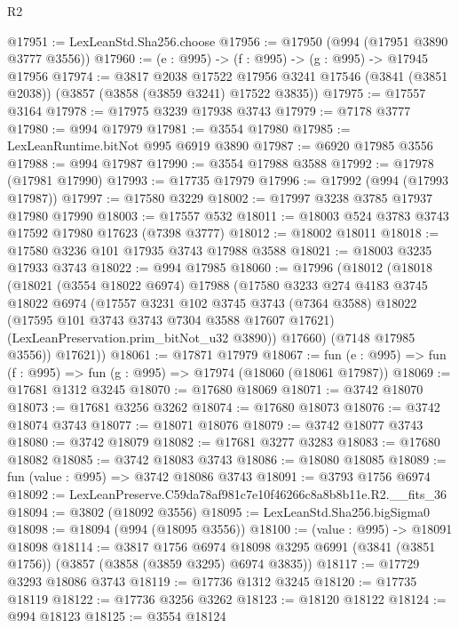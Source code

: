 \begin{lexlean}{R2}
\begin{coremodule}
@17951 := LexLeanStd.Sha256.choose
@17956 := @17950 (@994 (@17951 @3890 @3777 @3556))
@17960 := (e : @995) -> (f : @995) -> (g : @995) -> @17945 @17956
@17974 := @3817
    @2038
    @17522
    @17956
    @3241
    @17546
    (@3841 (@3851 @2038))
    (@3857 (@3858 (@3859 @3241) @17522 @3835))
@17975 := @17557 @3164
@17978 := @17975 @3239 @17938 @3743
@17979 := @7178 @3777
@17980 := @994 @17979
@17981 := @3554 @17980
@17985 := LexLeanRuntime.bitNot @995 @6919 @3890
@17987 := @6920 @17985 @3556
@17988 := @994 @17987
@17990 := @3554 @17988 @3588
@17992 := @17978 (@17981 @17990)
@17993 := @17735 @17979
@17996 := @17992 (@994 (@17993 @17987))
@17997 := @17580 @3229
@18002 := @17997 @3238 @3785 @17937 @17980 @17990
@18003 := @17557 @532
@18011 := @18003 @524 @3783 @3743 @17592 @17980 @17623 (@7398 @3777)
@18012 := @18002 @18011
@18018 := @17580 @3236 @101 @17935 @3743 @17988 @3588
@18021 := @18003 @3235 @17933 @3743
@18022 := @994 @17985
@18060 := @17996
    (@18012
      (@18018
        (@18021
          (@3554 @18022 @6974)
          @17988
          (@17580
            @3233
            @274
            @4183
            @3745
            @18022
            @6974
            (@17557
              @3231
              @102
              @3745
              @3743
              (@7364 @3588)
              @18022
              (@17595 @101 @3743 @3743 @7304 @3588 @17607 @17621)
              (LexLeanPreservation.prim_bitNot_u32 @3890))
            @17660)
          (@7148 @17985 @3556))
        @17621))
@18061 := @17871 @17979
@18067 := fun (e : @995) => fun (f : @995) => fun (g : @995) => @17974 (@18060 (@18061 @17987))
@18069 := @17681 @1312 @3245
@18070 := @17680 @18069
@18071 := @3742 @18070
@18073 := @17681 @3256 @3262
@18074 := @17680 @18073
@18076 := @3742 @18074 @3743
@18077 := @18071 @18076
@18079 := @3742 @18077 @3743
@18080 := @3742 @18079
@18082 := @17681 @3277 @3283
@18083 := @17680 @18082
@18085 := @3742 @18083 @3743
@18086 := @18080 @18085
@18089 := fun (value : @995) => @3742 @18086 @3743
@18091 := @3793 @1756 @6974
@18092 := LexLeanPreserve.C59da78af981c7e10f46266c8a8b8b11e.R2.__fits_36
@18094 := @3802 (@18092 @3556)
@18095 := LexLeanStd.Sha256.bigSigma0
@18098 := @18094 (@994 (@18095 @3556))
@18100 := (value : @995) -> @18091 @18098
@18114 := @3817
    @1756
    @6974
    @18098
    @3295
    @6991
    (@3841 (@3851 @1756))
    (@3857 (@3858 (@3859 @3295) @6974 @3835))
@18117 := @17729 @3293 @18086 @3743
@18119 := @17736 @1312 @3245
@18120 := @17735 @18119
@18122 := @17736 @3256 @3262
@18123 := @18120 @18122
@18124 := @994 @18123
@18125 := @3554 @18124

\end{coremodule}
\end{lexlean}
